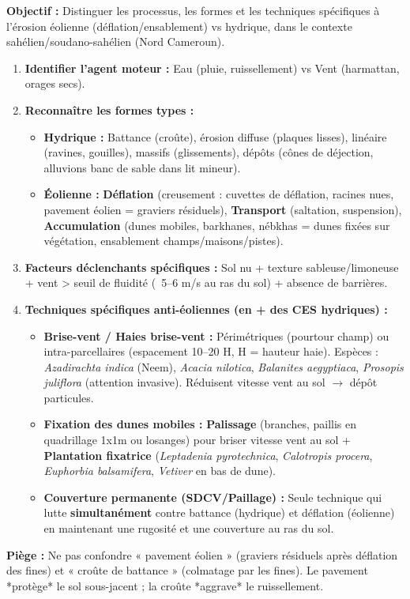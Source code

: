 \documentclass[11pt]{article}
\begin{document}
\begin{methode}
    \textbf{Objectif :} Distinguer les processus, les formes et les techniques spécifiques à l'érosion éolienne (déflation/ensablement) vs hydrique, dans le contexte sahélien/soudano-sahélien (Nord Cameroun).
    \begin{enumerate}
        \item \textbf{Identifier l'agent moteur :} Eau (pluie, ruissellement) vs Vent (harmattan, orages secs).
        \item \textbf{Reconnaître les formes types :}
        \begin{itemize}
            \item \textbf{Hydrique :} Battance (croûte), érosion diffuse (plaques lisses), linéaire (ravines, gouilles), massifs (glissements), dépôts (cônes de déjection, alluvions banc de sable dans lit mineur).
            \item \textbf{Éolienne :} \textbf{Déflation} (creusement : cuvettes de déflation, racines nues, pavement éolien = graviers résiduels), \textbf{Transport} (saltation, suspension), \textbf{Accumulation} (dunes mobiles, barkhanes, nébkhas = dunes fixées sur végétation, ensablement champs/maisons/pistes).
        \end{itemize}
        \item \textbf{Facteurs déclenchants spécifiques :} Sol nu + texture sableuse/limoneuse + vent > seuil de fluidité (~5–6 m/s au ras du sol) + absence de barrières.
        \item \textbf{Techniques spécifiques anti-éoliennes (en + des CES hydriques) :}
        \begin{itemize}
            \item \textbf{Brise-vent / Haies brise-vent :} Périmétriques (pourtour champ) ou intra-parcellaires (espacement 10–20 H, H = hauteur haie). Espèces : \emph{Azadirachta indica} (Neem), \emph{Acacia nilotica}, \emph{Balanites aegyptiaca}, \emph{Prosopis juliflora} (attention invasive). Réduisent vitesse vent au sol $\rightarrow$ dépôt particules.
            \item \textbf{Fixation des dunes mobiles :} \textbf{Palissage} (branches, paillis en quadrillage 1x1m ou losanges) pour briser vitesse vent au sol + \textbf{Plantation fixatrice} (\emph{Leptadenia pyrotechnica}, \emph{Calotropis procera}, \emph{Euphorbia balsamifera}, \emph{Vetiver} en bas de dune).
            \item \textbf{Couverture permanente (SDCV/Paillage) :} Seule technique qui lutte \textbf{simultanément} contre battance (hydrique) et déflation (éolienne) en maintenant une rugosité et une couverture au ras du sol.
        \end{itemize}
    \end{enumerate}
    \textbf{Piège :} Ne pas confondre « pavement éolien » (graviers résiduels après déflation des fines) et « croûte de battance » (colmatage par les fines). Le pavement *protège* le sol sous-jacent ; la croûte *aggrave* le ruissellement.
\end{methode}
\end{document}
